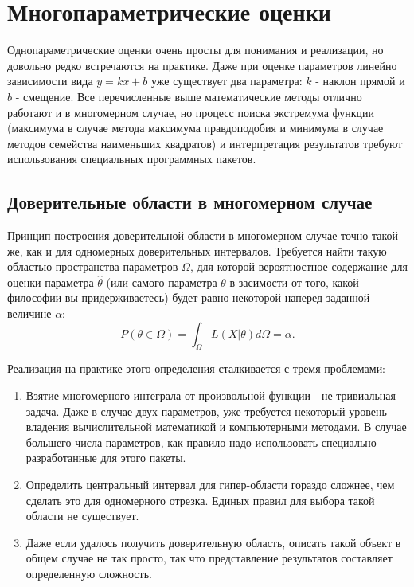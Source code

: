 


\section{Многопараметрические оценки}

    Однопараметрические оценки очень просты для понимания и реализации, но
довольно редко встречаются на практике. Даже при оценке параметров
линейно зависимости вида $y = k x + b$ уже существует два параметра:
$k$ - наклон прямой и $b$ - смещение. Все перечисленные выше
математические методы отлично работают и в многомерном случае, но
процесс поиска экстремума функции (максимума в случае метода максимума
правдоподобия и минимума в случае методов семейства наименьших
квадратов) и интерпретация результатов требуют использования специальных
программных пакетов.


\subsection{Доверительные области в многомерном случае}

    Принцип построения доверительной области в многомерном случае точно
такой же, как и для одномерных доверительных интервалов. Требуется найти
такую областью пространства параметров $\Omega$, для которой
вероятностное содержание для оценки параметра $\hat \theta$ (или
самого параметра $\theta$ в засимости от того, какой философии вы
придерживаетесь) будет равно некоторой наперед заданной величине
$\alpha$:
\begin{equation}
P(\theta \in \Omega) = \int_\Omega{L(X | \theta)}d\Omega = \alpha.
\end{equation}

Реализация на практике этого определения сталкивается с тремя
проблемами:

\begin{enumerate}
\item Взятие многомерного интеграла от произвольной функции - не тривиальная
  задача. Даже в случае двух параметров, уже требуется некоторый уровень
  владения вычислительной математикой и компьютерными методами. В случае
  большего числа параметров, как правило надо использовать специально
  разработанные для этого пакеты.
\item Определить центральный интервал для гипер-области гораздо сложнее, чем
  сделать это для одномерного отрезка. Единых правил для выбора такой
  области не существует.
\item Даже если удалось получить доверительную область, описать такой объект
  в общем случае не так просто, так что представление результатов
  составляет определенную сложность.
\end{enumerate}


